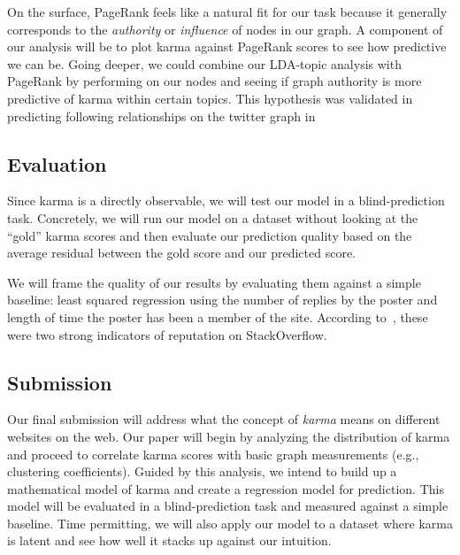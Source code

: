 \documentclass[10pt]{article}
\begin{document}
On the surface, PageRank feels like a natural fit for our task because it
generally corresponds to the \textit{authority} or \textit{influence} of nodes
in our graph. A component of our analysis will be to plot karma against PageRank
scores to see how predictive we can be.  Going deeper, we could combine our
LDA-topic analysis with PageRank by performing \citep{haveliwala2002topic} on 
our nodes and seeing if graph authority is
more predictive of karma within certain topics. This hypothesis was validated in
predicting following relationships on the twitter graph in
\citep{weng2010twitterrank}

\subsection{Evaluation}
Since karma is a directly observable, we will test our model in a
blind-prediction task. Concretely, we will run our model on a dataset without
looking at the ``gold'' karma scores and then evaluate our prediction quality
based on the average residual between the gold score and our predicted score.

We will frame the quality of our results by evaluating them against a simple
baseline: least squared regression using the number of replies by the poster and
length of time the poster has been a member of the site. According
to~\cite{movshovitzanalysis}, these were two strong indicators of reputation on
StackOverflow. 

\subsection{Submission}

Our final submission will address what the concept of \textit{karma} means on
different websites on the web. Our paper will begin by analyzing the
distribution of karma and proceed to correlate karma scores with basic graph
measurements (e.g., clustering coefficients). Guided by this analysis, we intend
to build up a mathematical model of karma and create a regression model for
prediction. This model will be evaluated in a blind-prediction task and measured
against a simple baseline. Time permitting, we will also apply our
model to a dataset where karma is latent and see how well it stacks up
against our intuition.



\end{document}

